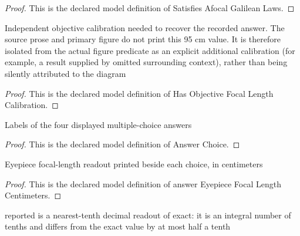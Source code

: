 \begin{proof}
  This is the declared model definition of Satisfies Afocal Galilean Laws.
\end{proof}
\begin{definition}
  \label{def:physics:phyx-mini-0111:phyxminiproblems-problemphyxmini0111-hasobjectivefocallengthcalibration}
  Independent objective calibration needed to recover the recorded answer. The source prose and primary figure do not print this 95 cm value. It is therefore isolated from the actual figure predicate as an explicit additional calibration (for example, a result supplied by omitted surrounding context), rather than being silently attributed to the diagram
\end{definition}
\begin{proof}
  This is the declared model definition of Has Objective Focal Length Calibration.
\end{proof}
\begin{definition}
  \label{def:physics:phyx-mini-0111:phyxminiproblems-problemphyxmini0111-answerchoice}
  Labels of the four displayed multiple-choice answers
\end{definition}
\begin{proof}
  This is the declared model definition of Answer Choice.
\end{proof}
\begin{definition}
  \label{def:physics:phyx-mini-0111:phyxminiproblems-problemphyxmini0111-answereyepiecefocallengthcentimeters}
  Eyepiece focal-length readout printed beside each choice, in centimeters
\end{definition}
\begin{proof}
  This is the declared model definition of answer Eyepiece Focal Length Centimeters.
\end{proof}
\begin{definition}
  \label{def:physics:phyx-mini-0111:phyxminiproblems-problemphyxmini0111-isnearesttenthreadout}
  reported is a nearest-tenth decimal readout of exact: it is an integral number of tenths and differs from the exact value by at most half a tenth
\end{definition}
